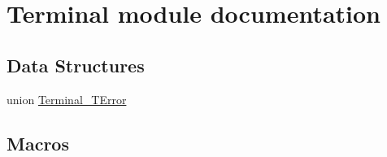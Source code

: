 \hypertarget{group___terminal__module}{}\section{Terminal module documentation}
\label{group___terminal__module}
\subsection*{Data Structures}
\begin{DoxyCompactItemize}
\item 
union \hyperlink{union_terminal___t_error}{Terminal\+\_\+\+T\+Error}
\end{DoxyCompactItemize}
\subsection*{Macros}
